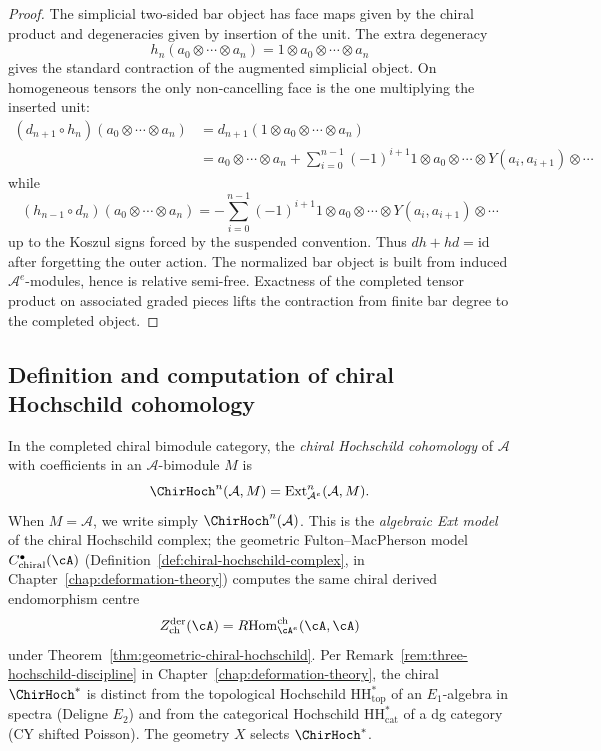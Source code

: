 \begin{proof}
The simplicial two-sided bar object has face maps given by the
chiral product and degeneracies given by insertion of the unit.
The extra degeneracy
\[
h_n(a_0 \otimes \cdots \otimes a_n) = 1 \otimes a_0 \otimes \cdots \otimes a_n
\]
gives the standard contraction of the augmented simplicial object.
On homogeneous tensors the only non-cancelling face is the one
multiplying the inserted unit:
\begin{align}
(d_{n+1} \circ h_n)(a_0 \otimes \cdots \otimes a_n) &= d_{n+1}(1 \otimes a_0 \otimes \cdots \otimes a_n) \\
&= a_0 \otimes \cdots \otimes a_n + \sum_{i=0}^{n-1} (-1)^{i+1} 1 \otimes a_0 \otimes \cdots \otimes Y(a_i, a_{i+1}) \otimes \cdots
\end{align}
while
\[
(h_{n-1} \circ d_n)(a_0 \otimes \cdots \otimes a_n) = -\sum_{i=0}^{n-1} (-1)^{i+1} 1 \otimes a_0 \otimes \cdots \otimes Y(a_i, a_{i+1}) \otimes \cdots
\]
up to the Koszul signs forced by the suspended convention.  Thus
$d h+h d=\mathrm{id}$ after forgetting the outer action.  The
normalized bar object is built from induced
$\mathcal A^e$-modules, hence is relative semi-free. Exactness of
the completed tensor product on associated graded pieces lifts the
contraction from finite bar degree to the completed object. \qedhere
\end{proof}

\subsection{Definition and computation of chiral Hochschild cohomology}

\begin{definition}
\label{def:chirHoch-Ext}

In the completed chiral bimodule category, the \emph{chiral
Hochschild cohomology} of $\mathcal{A}$ with coefficients in an
$\mathcal{A}$-bimodule $M$ is
\[
\ChirHoch^n(\mathcal{A}, M)
= \operatorname{Ext}^n_{\mathcal{A}^e}(\mathcal{A}, M).
\]
When $M = \mathcal{A}$, we write simply $\ChirHoch^n(\mathcal{A})$.
This is the \emph{algebraic Ext model} of the chiral Hochschild
complex; the geometric Fulton--MacPherson model
$C^\bullet_{\mathrm{chiral}}(\cA)$
\textup{(}Definition~\ref{def:chiral-hochschild-complex}, in
Chapter~\textup{\ref{chap:deformation-theory}}\textup{)} computes
the same chiral derived endomorphism centre
\[
 Z^{\mathrm{der}}_{\mathrm{ch}}(\cA)
 = R\!\operatorname{Hom}^{\mathrm{ch}}_{\cA^e}(\cA,\cA)
\]
under
Theorem~\textup{\ref{thm:geometric-chiral-hochschild}}. Per
Remark~\textup{\ref{rem:three-hochschild-discipline}} in
Chapter~\textup{\ref{chap:deformation-theory}}, the chiral
$\ChirHoch^*$ is distinct from the topological Hochschild
$\mathrm{HH}^*_{\mathrm{top}}$ of an $E_1$-algebra in spectra
\textup{(}Deligne $E_2$\textup{)} and from the categorical Hochschild
$\mathrm{HH}^*_{\mathrm{cat}}$ of a dg category \textup{(}CY shifted
Poisson\textup{)}. The geometry $X$ selects $\ChirHoch^*$.
\end{definition}

